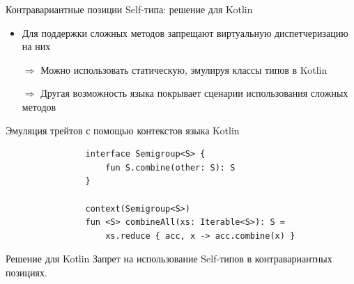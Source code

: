\documentclass[usenames, dvipsnames]{beamer}
\begin{document}
    \begin{frame}[fragile]{Контравариантные позиции Self-типа: решение для Kotlin}

        \begin{itemize}
            \item Для поддержки сложных методов запрещают виртуальную диспетчеризацию на них
            \item[$\Rightarrow$] Можно использовать статическую, эмулируя классы типов в Kotlin
            \item[$\Rightarrow$] Другая возможность языка покрывает сценарии использования сложных методов
        \end{itemize}

        \begin{block}{Эмуляция трейтов с помощью контекстов языка Kotlin}
            \begin{verbatim}
                interface Semigroup<S> {
                    fun S.combine(other: S): S
                }

                context(Semigroup<S>)
                fun <S> combineAll(xs: Iterable<S>): S =
                    xs.reduce { acc, x -> acc.combine(x) }
            \end{verbatim}
        \end{block}

        \begin{block}{Решение для Kotlin}
            Запрет на использование Self-типов в контравариантных позициях.
        \end{block}
    \end{frame}
\end{document}
